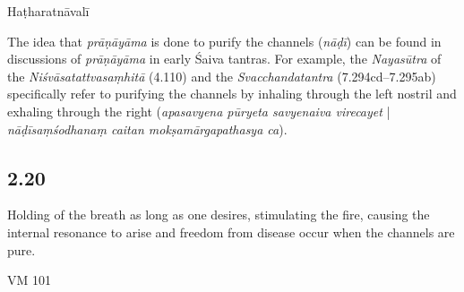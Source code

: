\begin{ekdosis}
\begin{sources}[hp02_019]
\begin{versinnote}
\end{versinnote}
\end{sources}

\begin{testimonia}[hp02_019]
Haṭharatnāvalī

\begin{versinnote}
\end{versinnote}
\end{testimonia}

\begin{philcomm}[hp02_019]
The idea that \emph{prāṇāyāma} is done to purify the channels (\emph{nāḍī}) can be found in discussions of \emph{prāṇāyāma} in early Śaiva tantras. For example, the \emph{Nayasūtra} of the \emph{Niśvāsatattvasaṃhitā} (4.110) and the \emph{Svacchandatantra} (7.294cd–7.295ab) specifically refer to purifying the channels by inhaling through the left nostril and exhaling through the right (\emph{apasavyena pūryeta savyenaiva virecayet} | \emph{nāḍīsaṃśodhanaṃ caitan mokṣamārgapathasya ca}).
\end{philcomm}

\subsection*{2.20}
\begin{translation}[hp02_020]
Holding of the breath as long as one desires, stimulating the fire, causing the internal resonance to arise and freedom from disease occur when the channels are pure.
\end{translation}

\begin{sources}[hp02_020]
VM 101

\begin{versinnote}
\end{versinnote}
\end{sources}


\end{ekdosis}

